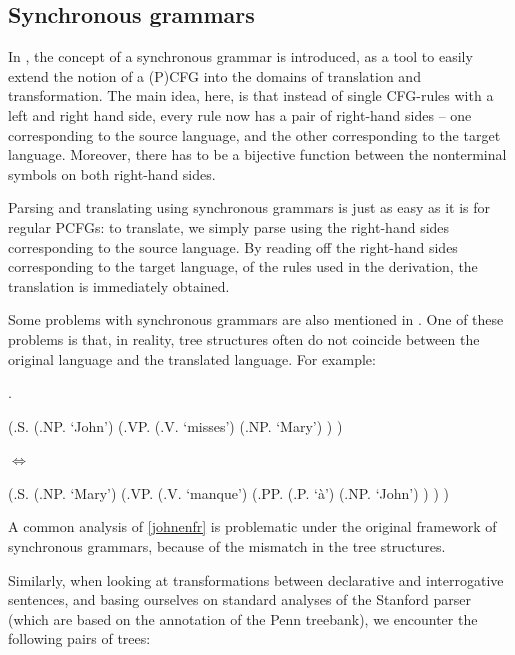 \documentclass[a4paper]{article}
\theoremstyle{definition}
\begin{document}
\subsection{Synchronous grammars}
\label{subsec:synch}

In \citet{chiang2006introduction}, the concept of a synchronous grammar is
introduced, as a tool to easily extend the notion of a (P)CFG into the domains
of translation and transformation. The main idea, here, is that instead of
single CFG-rules with a left and right hand side, every rule now has a pair of
right-hand sides -- one corresponding to the source language, and the other
corresponding to the target language. Moreover, there has to be a bijective
function between the nonterminal symbols on both right-hand sides.

Parsing and translating using synchronous grammars is just as easy as it is for
regular PCFGs: to translate, we simply parse using the right-hand sides
corresponding to the source language. By reading off the right-hand sides
corresponding to the target language, of the rules used in the derivation, the
translation is immediately obtained.

Some problems with synchronous grammars are also mentioned in
\citet{chiang2006introduction}. One of these problems is that, in reality, tree
structures often do not coincide between the original language and the
translated language. For example:

\ex.
\label{johnenfr}

\begin{center}
\begin{parsetree}
(.S.
	(.NP. `John')
	(.VP.
		(.V. `misses')
		(.NP. `Mary')
	)
)
\end{parsetree}
$\iff$ 
\begin{parsetree}
(.S.
	(.NP. `Mary')
	(.VP.
		(.V. `manque')
		(.PP.
			(.P. `\`a')
			(.NP. `John')
		)
	)
)
\end{parsetree}
\end{center}
\vspace{1em}

A common analysis of \ref{johnenfr} is problematic under the original
framework of synchronous grammars, because of the mismatch in the tree
structures.

Similarly, when looking at transformations between declarative and
interrogative sentences, and basing ourselves on standard analyses of the
Stanford parser (which are based on the annotation of the Penn
treebank), we encounter the following pairs of trees:
\end{document}
